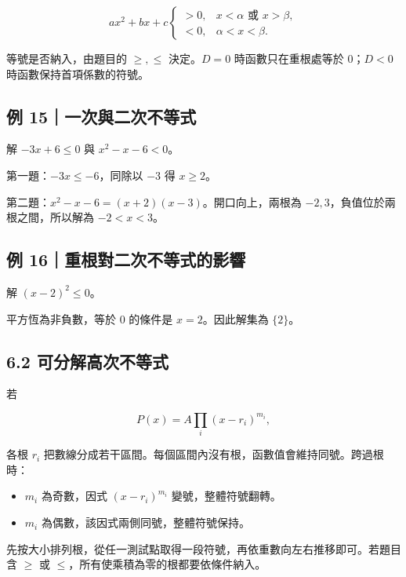 \documentclass[11pt,a4paper]{article}
\providecommand{\tightlist}{%
  \setlength{\itemsep}{0pt}\setlength{\parskip}{0pt}}
\begin{document}
\[
ax^2+bx+c
\begin{cases}
>0,&x<\alpha\text{ 或 }x>\beta,\\
<0,&\alpha<x<\beta.
\end{cases}
\]

等號是否納入，由題目的 \(\ge,\le\) 決定。\(D=0\) 時函數只在重根處等於 \(0\)；\(D<0\) 時函數保持首項係數的符號。

\subsection{例 15｜一次與二次不等式}\label{ux4f8b-15ux4e00ux6b21ux8207ux4e8cux6b21ux4e0dux7b49ux5f0f}

解 \(-3x+6\le0\) 與 \(x^2-x-6<0\)。

第一題：\(-3x\le-6\)，同除以 \(-3\) 得 \(\boxed{x\ge2}\)。

第二題：\(x^2-x-6=(x+2)(x-3)\)。開口向上，兩根為 \(-2,3\)，負值位於兩根之間，所以解為 \(\boxed{-2<x<3}\)。

\subsection{例 16｜重根對二次不等式的影響}\label{ux4f8b-16ux91cdux6839ux5c0dux4e8cux6b21ux4e0dux7b49ux5f0fux7684ux5f71ux97ff}

解 \((x-2)^2\le0\)。

平方恆為非負數，等於 \(0\) 的條件是 \(x=2\)。因此解集為 \(\boxed{\{2\}}\)。

\subsection{6.2 可分解高次不等式}\label{ux53efux5206ux89e3ux9ad8ux6b21ux4e0dux7b49ux5f0f}

若

\[
P(x)=A\prod_i(x-r_i)^{m_i},
\]

各根 \(r_i\) 把數線分成若干區間。每個區間內沒有根，函數值會維持同號。跨過根時：

\begin{itemize}
\tightlist
\item
  \(m_i\) 為奇數，因式 \((x-r_i)^{m_i}\) 變號，整體符號翻轉。
\item
  \(m_i\) 為偶數，該因式兩側同號，整體符號保持。
\end{itemize}

先按大小排列根，從任一測試點取得一段符號，再依重數向左右推移即可。若題目含 \(\ge\) 或 \(\le\)，所有使乘積為零的根都要依條件納入。
\end{document}
